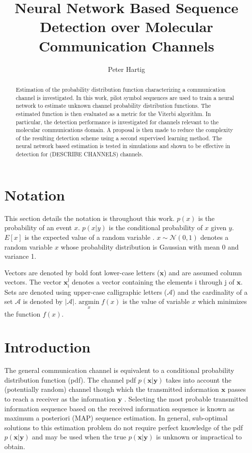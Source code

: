 \documentclass[12pt,a4paper]{report}
\title{Neural Network Based Sequence Detection over Molecular Communication Channels}
\author{Peter Hartig}
\begin{document}
\maketitle

\begin{abstract}
Estimation of the probability distribution function characterizing a communication channel is investigated. In this work, pilot symbol sequences are used to train a neural network to estimate unknown channel probability distribution functions. The estimated function is then evaluated as a metric for the Viterbi algorithm. In particular, the detection performance is investigated for channels relevant to the molecular communications domain. A proposal is then made to reduce the complexity of the resulting detection scheme using a second supervised learning method. The neural network based estimation is tested in simulations and shown to be effective in detection for (DESCRIBE CHANNELS) channels. 
\end{abstract}

\newpage
\tableofcontents
\newpage
\section{Notation}
This section details the notation is throughout this work.
$p(x)$ is the probability of an event $x$.
$p(x|y)$ is the conditional probability of $x$ given $y$.
$E[x]$ is the expected value of a random variable .
$x \sim \mathcal{N}(0,1)$ denotes a random variable $x$ whose probability distribution is Gaussian with mean 0 and variance 1. 

Vectors are denoted by bold font lower-case letters ($\mathbf{x}$) and are assumed column vectors.
The vector $\mathbf{x}_{\mathrm{i}}^{\mathrm{j}}$ denotes a vector containing the elements i through j of $\mathbf{x}$. Sets are denoted using upper-case calligraphic letters ($\mathcal{A}$) and the cardinality of a set $\mathcal{A}$ is denoted by $|\mathcal{A}|$.
$\underset{x}{\text{argmin}} \; f(x)$ is the value of variable $x$ which minimizes the function $f(x)$.

\section{Introduction}

The general communication channel is equivalent to a conditional probability distribution function (pdf). The channel pdf $p(\mathbf{x}|\mathbf{y})$ takes into account the (potentially random) channel though which the transmitted information $\mathbf{x}$ passes to reach a receiver as the information $\mathbf{y}$ \cite[Ch.~7]{cover2012elements}. Selecting the most probable transmitted information sequence based on the received information sequence is known as maximum a posteriori (MAP) sequence estimation. In general, sub-optimal solutions to this estimation problem do not require perfect knowledge of the pdf $p(\mathbf{x}|\mathbf{y})$ and may be used when the true $p(\mathbf{x}|\mathbf{y})$ is unknown or impractical to obtain.
\end{document}

